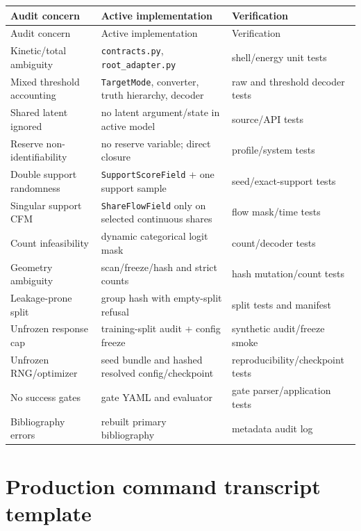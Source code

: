 \documentclass[10pt,a4paper]{article}
\begin{document}
\begin{longtable}{@{}p{}p{}p{}@{}}
\toprule
Audit concern & Active implementation & Verification \\
\midrule
\endfirsthead
\toprule
Audit concern & Active implementation & Verification \\
\midrule
\endhead
Kinetic/total ambiguity & \texttt{contracts.py}, \texttt{root\_adapter.py} & shell/energy unit tests \\
Mixed threshold accounting & \texttt{TargetMode}, converter, truth hierarchy, decoder & raw and threshold decoder tests \\
Shared latent ignored & no latent argument/state in active model & source/API tests \\
Reserve non-identifiability & no reserve variable; direct closure & profile/system tests \\
Double support randomness & \texttt{SupportScoreField} + one support sample & seed/exact-support tests \\
Singular support CFM & \texttt{ShareFlowField} only on selected continuous shares & flow mask/time tests \\
Count infeasibility & dynamic categorical logit mask & count/decoder tests \\
Geometry ambiguity & scan/freeze/hash and strict counts & hash mutation/count tests \\
Leakage-prone split & group hash with empty-split refusal & split tests and manifest \\
Unfrozen response cap & training-split audit + config freeze & synthetic audit/freeze smoke \\
Unfrozen RNG/optimizer & seed bundle and hashed resolved config/checkpoint & reproducibility/checkpoint tests \\
No success gates & gate YAML and evaluator & gate parser/application tests \\
Bibliography errors & rebuilt primary bibliography & metadata audit log \\
\bottomrule
\end{longtable}

\section{Production command transcript template}
\end{document}

